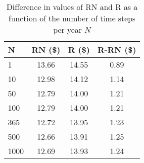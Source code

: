 \vspace*{15pt}
\begin{table}[h]
    \centering
    \begin{tabular}{|l|c|c|c|}
       
        \hline
        \textbf{N} & \textbf{RN (\$)} & \textbf{R (\$)} & \textbf{R-RN (\$)}\\
        \hline
        1 & 13.66 & 14.55 & 0.89 \\
        \hline
        10 & 12.98 & 14.12 & 1.14 \\
        \hline
        50 & 12.79 & 14.00 & 1.21 \\
        \hline
        100 & 12.79 & 14.00 & 1.21 \\
        \hline
        365 & 12.72 & 13.95 & 1.23 \\
        \hline
        500 & 12.66 & 13.91 & 1.25 \\
        \hline
        1000 & 12.69 & 13.93 & 1.24 \\
        \hline
    \end{tabular}
    \caption{Difference in values of RN and R as a function of the number of time steps per year $N$}
    \label{tab:diff_n}
\end{table}
\vspace*{15pt}